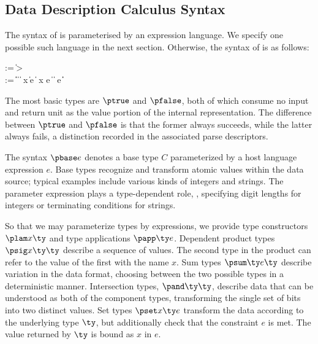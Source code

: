 \subsection{Data Description Calculus Syntax}
The syntax of \ddc{} is parameterised by an expression language.  We specify one possible such language in the next section.  Otherwise,
the syntax of \ddc{} is as follows:
\begin{bnf}
   \meta{\gk} \::= \kty \| \ity \-> \gk 
                               \pext{\| \gk \-> \gk} \\
   \meta{\ty} \::= 
    \ptrue\| \pfalse \|  \| 
    \plam{\var}{\ity}{\ty} \|  \nlalt
    \psig x \ty \ty \| \psum \ty e \ty \| \pand \ty \ty \nlalt 
    \pset x \ty e \|
    \pseq \ty {} \nlalt
    \ptyvar \| \pmu{\ptyvar}{\ty} \nlalt
    \pcompute e \ity \| \pabsorb \ty \| \pscan{\ty} 
\end{bnf}%
\noindent
The most basic types are $\ptrue$ and $\pfalse$, both of which consume no input
and return unit as the value portion of the internal representation. 
The difference between $\ptrue$ and $\pfalse$ is that the former always succeeds, while the latter always fails, a distinction recorded in the associated parse descriptors.


The syntax $\pbase e$ denotes a base type $C$ parameterized by a host language expression $e$.
Base types recognize and transform atomic values within the
data source; typical examples include various kinds of integers and strings. 
The parameter expression plays a type-dependent role, \eg{}, specifying digit lengths for integers or terminating conditions for strings.

So that we may parameterize types by expressions, we provide type constructors
$\plam x {} \ty$ and type applications $\papp \ty e$.
Dependent product types $\psig x \ty \ty$ describe a sequence of
values. The second type in the product can refer to the value of the
first with the name $x$. Sum types $\psum \ty e \ty$ describe
variation in the data format, choosing between the two possible types
in a deterministic manner. Intersection types, $\pand \ty \ty$,
describe data that can be understood as both of the component types,
transforming the single set of bits into two distinct values.  Set
types $\pset x \ty e$ transform the data according to the underlying
type $\ty$, but additionally check that the constraint $e$ is met.
The value returned by $\ty$ is bound as $x$ in $e$.

